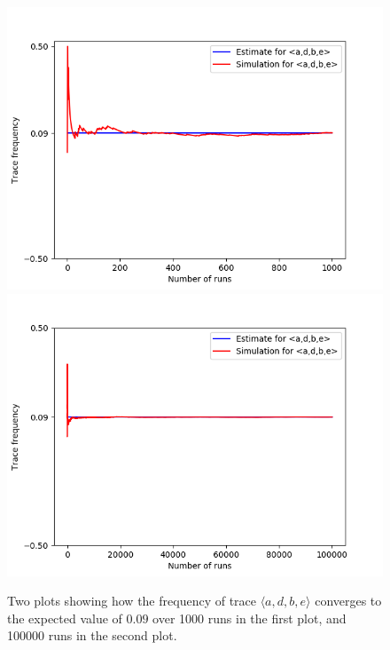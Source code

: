 \begin{figure}%
    \centering
    {{\includegraphics[width=12cm]{figures/adbe1.png} }}%
    \qquad
    {{\includegraphics[width=12cm]{figures/adbe100.png} }}%
    \caption{Two plots showing how the frequency of trace $\langle a,d,b,e \rangle$ converges to the expected value of $0.09$ over 1000 runs in the first plot, and 100000 runs in the second plot.}%
    \label{fig: adbe}%
\end{figure}
%
%
%
%
%
%
